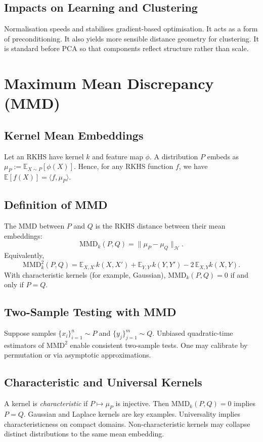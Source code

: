 \subsection{Impacts on Learning and Clustering}
Normalisation speeds and stabilises gradient-based optimisation. It acts as a form of preconditioning. It also yields more sensible distance geometry for clustering. It is standard before PCA so that components reflect structure rather than scale.

\section{Maximum Mean Discrepancy (MMD)}

\subsection{Kernel Mean Embeddings}
Let an RKHS have kernel $k$ and feature map $\phi$. A distribution $P$ embeds as $\mu_P := \mathbb{E}_{X\sim P}[\phi(X)]$. Hence, for any RKHS function $f$, we have $\mathbb{E}[f(X)] = \langle f,\mu_P\rangle$.

\subsection{Definition of MMD}
The MMD between $P$ and $Q$ is the RKHS distance between their mean embeddings:
\[
\mathrm{MMD}_k(P,Q) = \|\mu_P - \mu_Q\|_{\mathcal H}.
\]
Equivalently,
\[
\mathrm{MMD}^2_k(P,Q) = \mathbb{E}_{X,X'}k(X,X') + \mathbb{E}_{Y,Y'}k(Y,Y') - 2\,\mathbb{E}_{X,Y}k(X,Y).
\]
With characteristic kernels (for example, Gaussian), $\mathrm{MMD}_k(P,Q)=0$ if and only if $P=Q$.

\subsection{Two-Sample Testing with MMD}
Suppose samples $\{x_i\}_{i=1}^n \sim P$ and $\{y_j\}_{j=1}^m \sim Q$. Unbiased quadratic-time estimators of $\mathrm{MMD}^2$ enable consistent two-sample tests. One may calibrate by permutation or via asymptotic approximations.

\subsection{Characteristic and Universal Kernels}
A kernel is \emph{characteristic} if $P \mapsto \mu_P$ is injective. Then $\mathrm{MMD}_k(P,Q)=0$ implies $P=Q$. Gaussian and Laplace kernels are key examples. Universality implies characteristicness on compact domains. Non-characteristic kernels may collapse distinct distributions to the same mean embedding.

